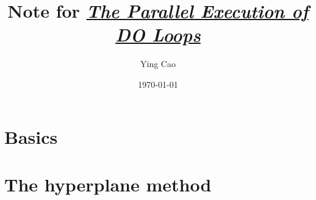 \documentclass {article}
\title{Note for
\textit{\href{https://www.microsoft.com/en-us/research/wp-content/uploads/2016/12/The-Parallel-Execution-of-DO-Loops.pdf}
{The Parallel Execution of DO Loops}}}
\author{Ying Cao}
\date{\today}
\begin{document}
\maketitle
\tableofcontents

\section{Basics}


\section{The hyperplane method}


{
\small
\raggedright

\begin{spacing}{1}

\end{spacing}
}
\end{document}
